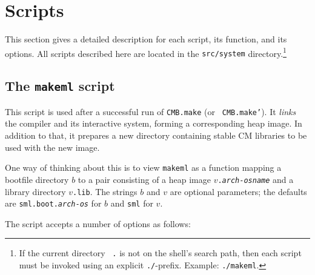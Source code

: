 
\section{Scripts}

This section gives a detailed description for each script, its
function, and its options.  All scripts described here are located in
the {\tt src/system} directory.\footnote{If the current directory {\tt
.} is not on the shell's search path, then each script must be invoked
using an explicit {\tt ./}-prefix.  Example: {\tt ./makeml}.}

\subsection{The {\tt makeml} script}
\label{script:makeml}

This script is used after a successful run of {\tt CMB.make} (or {\tt
CMB.make'}).  It {\em links} the compiler and its interactive system,
forming a corresponding heap image.  In addition to that, it prepares
a new directory containing stable CM libraries to be used with the new
image.

One way of thinking about this is to view {\tt makeml} as a function
mapping a bootfile directory $b$ to a
pair consisting of a heap image {\tt $v$.{\it arch}-{\it osname}} and
a library directory {\tt $v$.lib}.  The strings $b$ and $v$ are
optional parameters; the defaults are {\tt sml.boot.{\it arch}-{\it os}}
for $b$ and {\tt sml} for $v$.

The script accepts a number of options as follows:

